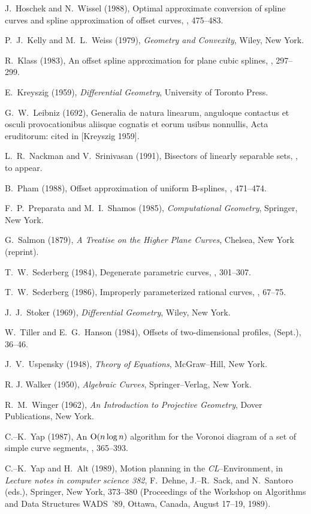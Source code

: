 \begin{thebibliography}{99}
J.~Hoschek and N.~Wissel (1988), Optimal approximate conversion of
spline curves and spline approximation of offset curves, ,
475--483.

P.~J.~Kelly and M.~L.~Weiss (1979), {\it Geometry and Convexity}, Wiley,
New York.

R.~Klass (1983), An offset spline approximation for plane cubic
splines, , 297--299.

E.~Kreyszig (1959), {\it Differential Geometry}, University of
Toronto Press.

G.~W.~Leibniz (1692), Generalia de natura linearum, anguloque
contactus et osculi provocationibus aliisque cognatis et eorum
usibus nonnullis, Acta eruditorum: cited in [Kreyszig 1959].

L.~R.~Nackman and V.~Srinivasan (1991), Bisectors of linearly
separable sets, , to appear.

B.~Pham (1988), Offset approximation of uniform B-splines,
, 471--474.

F.~P.~Preparata and M.~I.~Shamos (1985), {\it Computational
Geometry}, Springer, New York.

G.~Salmon (1879), {\it A Treatise on the Higher Plane Curves},
Chelsea, New York (reprint).

T.~W.~Sederberg (1984), Degenerate parametric curves, ,
301--307.

T.~W.~Sederberg (1986), Improperly parameterized rational curves,
, 67--75.

J.~J.~Stoker (1969), {\it Differential Geometry}, Wiley, New York.

W.~Tiller and E.~G.~Hanson (1984), Offsets of two-dimensional
profiles,  (Sept.), 36--46.

J.~V.~Uspensky (1948), {\it Theory of Equations}, McGraw--Hill,
New York.

R. J. Walker (1950),
{\it Algebraic Curves},
Springer--Verlag, New York.

R.~M.~Winger (1962), {\it An Introduction to Projective Geometry},
Dover Publications, New York.

C.--K.~Yap (1987), An ${\rm O}(n\log n)$ algorithm for the Voronoi
diagram of a set of simple curve segments, , 365--393.

C.--K.~Yap and H.~Alt (1989), Motion planning in the {\it
CL\/}--Environment, in {\it Lecture notes in computer science 382},
F.~Dehne, J.--R.~Sack, and N.~Santoro (eds.), Springer, New York,
373--380 (Proceedings of the Workshop on Algorithms and Data
Structures WADS~'89, Ottawa, Canada, August 17--19, 1989).

\end{thebibliography}


